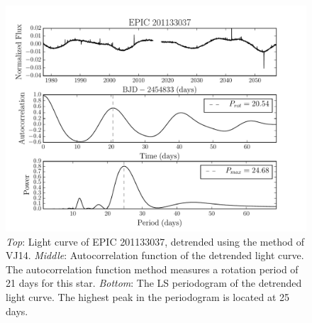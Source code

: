 \documentclass[useAMS, usenatbib, preprint, 12pt]{aastex}
\begin{document}
\begin{figure}
\begin{center}
\includegraphics[width=6in, clip=true]{rotation201133037.pdf}
\caption{{\it Top}: Light curve of EPIC 201133037, detrended using the method
	of VJ14.
	{\it Middle}: Autocorrelation function of the detrended light
	curve. The autocorrelation function method measures a rotation period
	of 21 days for this star.
	{\it Bottom}: The LS periodogram of the detrended light curve.
	The highest peak in the periodogram is located at 25 days.}
\label{fig:rotation_poster_child}
\end{center}
\end{figure}
\end{document}
